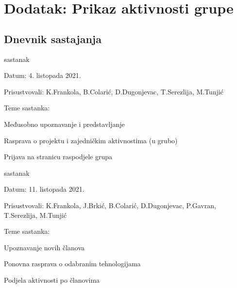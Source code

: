 \chapter*{Dodatak: Prikaz aktivnosti grupe}
		
		\section*{Dnevnik sastajanja}

		\begin{packed_enum}
			\item  sastanak
			
			\item[] \begin{packed_item}
				\item Datum: 4. listopada 2021.
				\item Prisustvovali: K.Frankola, B.Colarić, D.Dugonjevac, T.Serezlija, M.Tunjić
				\item Teme sastanka:
				\begin{packed_item}
					\item  Međusobno upoznavanje i predstavljanje
					\item  Rasprava o projektu i zajedničkim aktivnostima (u grubo)
					\item  Prijava na stranicu raspodjele grupa
				\end{packed_item}
			\end{packed_item}
			
			\item  sastanak
			\item[] \begin{packed_item}
				\item Datum: 11. listopada 2021.
				\item Prisustvovali: K.Frankola, J.Brkić, B.Colarić, D.Dugonjevac, P.Gavran, T.Serezlija, M.Tunjić
				\item Teme sastanka:
				\begin{packed_item}
					\item  Upoznavanje novih članova
					\item  Ponovna rasprava o odabranim tehnologijama
					\item  Podjela aktivnosti po članovima
				\end{packed_item}
			\end{packed_item}
		

\end{packed_enum}
